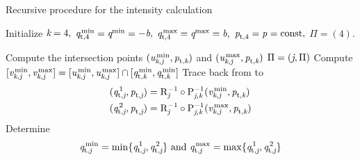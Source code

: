 \begin{algorithm}
\caption{Recursive procedure for the intensity calculation}\label{alg}
Initialize {$\textit{k}=4,$  $\textit{q}_{\textrm{t,} \textit{$4$}}^\textrm{\,min} = \textit{q}^{\textrm{min}} = -\textit{b},$ 
 $\textit{q}_{\textrm{t,} \textit{$4$}}^ \textrm{\,max}= \textit{q}^{\textrm{max}}=\textit{b},$ $\textit{p}_{\textrm{t,} \textit{$4$}} = \textit{p}_{\textrm{} \textit{}} =  \mbox{const},$  $\Pi = (4)$. }
\begin{algorithmic}[1]
   \If{$\lineai\neq\lineaj$}
   \State Compute the intersection points 
    $(\textit{u}_{\textit{k}, \textit{j}}^\textrm{\,min}, \textit{p}_{\textrm{t,} \textit{\textit{k}}})$ and $(\textit{u}_{\textit{k}, \textit{j}}^\textrm{\,max}, \textit{p}_{\textrm{t,} \textit{\textit{k}}})$
 \State $\Pi=(\textit{j}, \Pi)$
           \State Compute 
     $      [\textit{v}_{\textit{k}, \textit{j}}^\textrm{\,min}, \textit{v}_{\textit{k}, \textit{j}}^\textrm{\,max}] = [\textit{u}_{\textit{k}, \textit{j}}^\textrm{\,min}, \textit{u}_{\textit{k}, \textit{j}}^\textrm{\,max}]\cap
           [\textit{q}_{\textrm{t,} \textit{\textit{k}}}^\textrm{\,min}, \textit{q}_{\textrm{t,} \textit{\textit{k}}}^\textrm{\,min}] $
           \State Trace back from  to 
           \begin{equation*}
           \begin{aligned}
           (\textit{q}_{\textrm{t,} \textit{\textit{j}}}^{\,1}, \textit{p}_{\textrm{t,} \textit{\textit{j}}})& =\mathrm{R}_{{\textit{j}}}^{-1}\circ \mathrm{P}_{{\textit{j},\textit{k}}}^{-1}(\textit{v}_{\textit{k},\textit{j}}^\textrm{\,min}, \textit{p}_{\textrm{t,} \textit{\textit{k}}})  \\
           (\textit{q}_{\textrm{t,} \textit{\textit{j}}}^{\,2}, \textit{p}_{\textrm{t,} \textit{\textit{j}}}) & =\mathrm{R}_{{\textit{j}}}^{-1}\circ \mathrm{P}_{{\textit{j},\textit{k}}}^{-1}(\textit{v}_{\textit{k},\textit{j}}^\textrm{\,max}, \textit{p}_{\textrm{t,} \textit{\textit{k}}})
           \end{aligned}
           \end{equation*}
           \State Determine \begin{equation*}
\textit{q}_{\textrm{t,} \textit{\textit{j}}}^\textrm{\,min}= \min\{\textit{q}_{\textrm{t,} \textit{\textit{j}}}^{\,1}, \textit{q}_{\textrm{t,} \textit{\textit{j}}}^{\,2}\} \mbox{ and }
\textit{q}_{\textrm{t,} \textit{\textit{j}}}^\textrm{\,max}= \max\{\textit{q}_{\textrm{t,} \textit{\textit{j}}}^{\,1}, \textit{q}_{\textrm{t,} \textit{\textit{j}}}^{\,2}\}
\end{equation*}
          \State{}

\end{algorithmic}
\end{algorithm}
